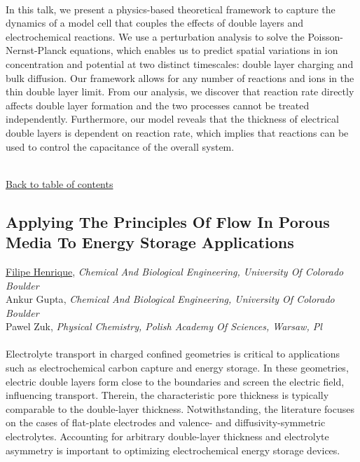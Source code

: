 \noindent  \\ 
\noindent In this talk, we present a physics-based theoretical framework to capture the dynamics of a model cell that couples the effects of double layers and electrochemical reactions. We use a perturbation analysis to solve the Poisson-Nernst-Planck equations, which enables us to predict spatial variations in ion concentration and potential at two distinct timescales: double layer charging and bulk diffusion. Our framework allows for any number of reactions and ions in the thin double layer limit. From our analysis, we discover that reaction rate directly affects double layer formation and the two processes cannot be treated independently. Furthermore, our model reveals that the thickness of electrical double layers is dependent on reaction rate, which implies that reactions can be used to control the capacitance of the overall system. \\ 
\noindent  \\ 
\begin{flushright}\vspace{-0.2 in}\hyperlink{toc}{Back to table of contents}\end{flushright}\vspace{-0.2 in}
\hypertarget{FilipeHenrique}{\subsection*{\color{CUGOLD} Applying The Principles Of Flow In Porous Media To Energy Storage Applications}} \vsp 
\underline{Filipe Henrique}, \textit{Chemical And Biological Engineering, University Of Colorado Boulder}\\ 
{Ankur Gupta}, \textit{Chemical And Biological Engineering, University Of Colorado Boulder}\\ 
{Pawel Zuk}, \textit{Physical Chemistry, Polish Academy Of Sciences, Warsaw, Pl}\\ 
\vspace{-0.1 in} \\ 
\noindent Electrolyte transport in charged confined geometries is critical to applications such as electrochemical carbon capture and energy storage. In these geometries, electric double layers form close to the boundaries and screen the electric field, influencing transport. Therein, the characteristic pore thickness is typically comparable to the double-layer thickness. Notwithstanding, the literature focuses on the cases of flat-plate electrodes and valence- and diffusivity-symmetric electrolytes. Accounting for arbitrary double-layer thickness and electrolyte asymmetry is important to optimizing electrochemical energy storage devices. \\ 
